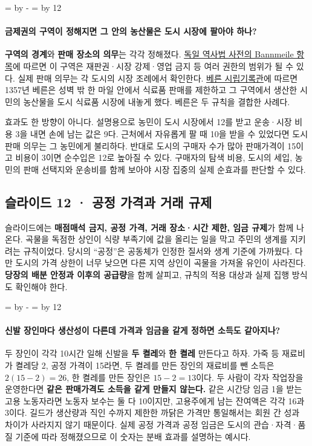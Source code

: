 \documentclass[10pt,a4paper]{article}
\newcommand{\ReserveQuestionSpace}{%
  \par\begingroup
  \dimen0=\pagegoal \advance\dimen0 by -\pagetotal
  \dimen2=\baselineskip \multiply\dimen2 by 12
  \ifdim\dimen0<\dimen2 \newpage\fi
  \endgroup}
\begin{document}
\ReserveQuestionSpace
\paragraph{금제권의 구역이 정해지면 그 안의 농산물은 도시 시장에 팔아야 하나?}
\textbf{구역의 경계}와 \textbf{판매 장소의 의무}는 각각 정해졌다. \href{https://drw-www.adw.uni-heidelberg.de/drw-cgi/zeige?index=lemmata\&term=bannmeile}{독일 역사법 사전의 Bannmeile 항목}에 따르면 이 구역은 재판권·시장 강제·영업 금지 등 여러 권한의 범위가 될 수 있다. 실제 판매 의무는 각 도시의 시장 조례에서 확인한다. \href{https://www.bern.ch/themen/stadt-recht-und-politik/informationen-im-stadtarchiv/suche-nach-themen-und-ereignissen/internetpublikation-gott-ist-burger-zu-bern/raeumliche-gliederung-des-stadtgebiets/zunft-und-gewerbeanlagen/maerkte/marktordnungen-und-marktzwang}{베른 시립기록관}에 따르면 1357년 베른은 성벽 밖 한 마일 안에서 식료품 판매를 제한하고 그 구역에서 생산한 시민의 농산물을 도시 식료품 시장에 내놓게 했다. 베른은 두 규칙을 결합한 사례다.\par

효과도 한 방향이 아니다. 설명용으로 농민이 도시 시장에서 12를 받고 운송·시장 비용 3을 내면 손에 남는 값은 9다. 근처에서 자유롭게 팔 때 10을 받을 수 있었다면 도시 판매 의무는 그 농민에게 불리하다. 반대로 도시의 구매자 수가 많아 판매가격이 15이고 비용이 3이면 순수입은 12로 높아질 수 있다. 구매자의 탐색 비용, 도시의 세입, 농민의 판매 선택지와 운송비를 함께 보아야 시장 집중의 실제 순효과를 판단할 수 있다.\par

\subsection{슬라이드 12 · 공정 가격과 거래 규제}
슬라이드에는 \textbf{매점매석 금지, 공정 가격, 거래 장소·시간 제한, 임금 규제}가 함께 나온다. 곡물을 독점한 상인이 식량 부족기에 값을 올리는 일을 막고 주민의 생계를 지키려는 규칙이었다. 당시의 “공정”은 공동체가 인정한 질서와 생계 기준에 가까웠다. 다만 도시의 가격 상한이 너무 낮으면 다른 지역 상인이 곡물을 가져올 유인이 사라진다. \textbf{당장의 배분 안정과 이후의 공급량}을 함께 살피고, 규칙의 적용 대상과 실제 집행 방식도 확인해야 한다.\par

\ReserveQuestionSpace
\paragraph{신발 장인마다 생산성이 다른데 가격과 임금을 같게 정하면 소득도 같아지나?}
두 장인이 각각 10시간 일해 신발을 \textbf{두 켤레}와 \textbf{한 켤레} 만든다고 하자. 가죽 등 재료비가 켤레당 2, 공정 가격이 15라면, 두 켤레를 만든 장인의 재료비를 뺀 소득은 $2(15-2)=26$, 한 켤레를 만든 장인은 $15-2=13$이다. 두 사람이 각자 작업장을 운영한다면 \textbf{같은 판매가격도 소득을 같게 만들지 않는다.} 같은 시간당 임금 1을 받는 고용 노동자라면 노동자 보수는 둘 다 10이지만, 고용주에게 남는 잔여액은 각각 16과 3이다. 길드가 생산량과 직인 수까지 제한한 까닭은 가격만 통일해서는 회원 간 성과 차이가 사라지지 않기 때문이다. 실제 공정 가격과 공정 임금은 도시의 관습·자격·품질 기준에 따라 정해졌으므로 이 숫자는 분배 효과를 설명하는 예시다.\par
\end{document}
